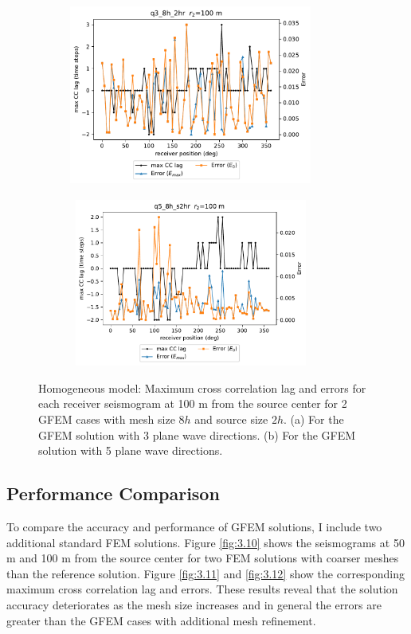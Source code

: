  \begin{figure}[h!]
 		\centering
		\begin{subfigure}{8cm}
				\includegraphics[width=8cm, height=6cm]{Thesis_Edith/figures/homo/homo_waves/Err_q3_8h_2hr_100m.pdf}
			     \caption{}
		\end{subfigure}
        \hspace{0.25cm}
		\begin{subfigure}{8cm}
				\includegraphics[width=8cm, height=5.5cm]{Thesis_Edith/figures/homo/homo_waves/Err_q5_8h_s2hr_100m.pdf}
			   \caption{}
		\end{subfigure}
 
	\caption{Homogeneous model: Maximum cross correlation lag and errors for each receiver seismogram at 100 m from the source center for 2 GFEM cases with mesh size $8h$ and source size $2h$. (a) For the GFEM solution with 3 plane wave directions. (b) For the GFEM solution with 5 plane wave directions.}  
	\label{fig:3.9}
\end{figure}

\clearpage
\subsection{Performance Comparison}
To compare the accuracy and performance of GFEM solutions, I include two additional standard FEM solutions. Figure \ref{fig:3.10} shows the seismograms at 50 m and 100 m from the source center for two FEM solutions with coarser meshes than the reference solution. Figure \ref{fig:3.11} and \ref{fig:3.12} show the corresponding maximum cross correlation lag and errors. These results reveal that the solution accuracy deteriorates as the mesh size increases and in general the errors are greater than the GFEM cases with additional mesh refinement.

